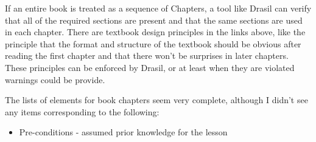 \documentclass[12pt]{article}
\begin{document}
If an entire book is treated as a sequence of Chapters, a tool like Drasil can
verify that all of the required sections are present and that the same sections
are used in each chapter.  There are textbook design principles in the links
above, like the principle that the format and structure of the textbook should
be obvious after reading the first chapter and that there won't be surprises in
later chapters.  These principles can be enforced by Drasil, or at least when
they are violated warnings could be provide.

The lists of elements for book chapters seem very complete, although I didn't
see any items corresponding to the following:

\begin{itemize}
\item Pre-conditions - assumed prior knowledge for the lesson
\end{itemize}
\end{document}
